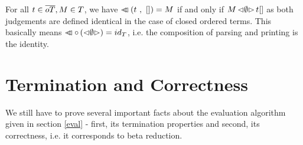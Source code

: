 \documentclass[submission,copyright,creativecommons]{eptcs}
\begin{document}
For all $t \in \overline{oT}, M \in T$, we have $\lhd \hspace{-8pt} \lhd \left( t \ , \ [] \right) = M$ if and only if $M \, { \mathord{\lhd} {\emptyset} \mathord{\rhd} } \, t []$ as both judgements are defined identical in the case of closed ordered terms. This basically means $\lhd \hspace{-8pt} \lhd \circ \left(\mathord{\lhd} {\emptyset} \mathord{\rhd}\right)  = id_{T}$, i.e. the composition of parsing and printing is the identity.


\section{Termination and Correctness}


We still have to prove several important facts about the evaluation algorithm given in section \ref{eval} - first, its termination properties and second, its correctness, i.e. it corresponds to beta reduction. 
\end{document}
